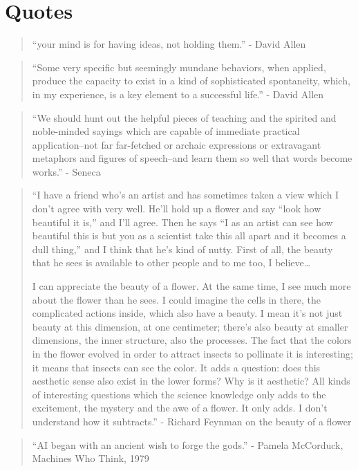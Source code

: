 \chapter{Quotes}

\begin{quotation}
“your mind is for having ideas, not holding them.” - David Allen
\end{quotation}

\begin{quotation}
``Some very specific but seemingly mundane behaviors, when applied, produce the capacity to exist in a kind of sophisticated spontaneity, which, in my experience, is a key element to a successful life.'' - David Allen
\end{quotation}

\begin{quotation}
“We should hunt out the helpful pieces of teaching and the spirited and noble-minded sayings which are capable of immediate practical application–not far far-fetched or archaic expressions or extravagant metaphors and figures of speech–and learn them so well that words become works.” - Seneca
\end{quotation}

\begin{quotation}
``I have a friend who’s an artist and has sometimes taken a view which I don’t agree with very well. He’ll hold up a flower and say “look how beautiful it is,” and I’ll agree. Then he says “I as an artist can see how beautiful this is but you as a scientist take this all apart and it becomes a dull thing,” and I think that he’s kind of nutty. First of all, the beauty that he sees is available to other people and to me too, I believe…

I can appreciate the beauty of a flower. At the same time, I see much more about the flower than he sees. I could imagine the cells in there, the complicated actions inside, which also have a beauty. I mean it’s not just beauty at this dimension, at one centimeter; there’s also beauty at smaller dimensions, the inner structure, also the processes. The fact that the colors in the flower evolved in order to attract insects to pollinate it is interesting; it means that insects can see the color. It adds a question: does this aesthetic sense also exist in the lower forms? Why is it aesthetic? All kinds of interesting questions which the science knowledge only adds to the excitement, the mystery and the awe of a flower. It only adds. I don’t understand how it subtracts.'' - Richard Feynman on the beauty of a flower
\end{quotation}

\begin{quote}
``AI began with an ancient wish to forge the gods.'' - Pamela McCorduck, Machines Who Think, 1979
\end{quote}
